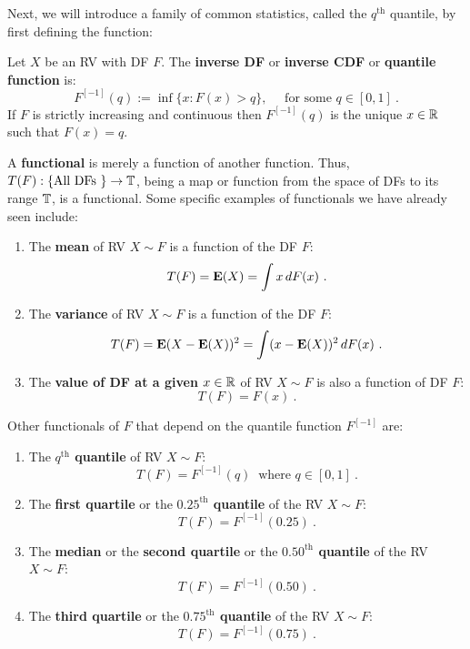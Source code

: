 Next, we will introduce a family of common statistics, called the $q^{\text{th}}$ quantile, by first defining the function:
\begin{definition}
Let $X$ be an RV with DF $F$.  The {\bf inverse DF} or {\bf inverse CDF} or {\bf quantile function} is:
\begin{equation}\label{E:InverseCDF}
F^{[-1]}(q) := \inf { \{ x: F(x) > q \}}, \quad \text{ for some $q \in [0,1]$} \ .
\end{equation} 
If $F$ is strictly increasing and continuous then $F^{[-1]}(q)$ is the unique $x \in \mathbb{R}$ such that $F(x)=q$.
\end{definition}
A {\bf functional} is merely a function of another function.  Thus, $T(F): \{ \text{All DFs }\} \to \mathbb{T}$, being a map or function from the space of DFs to its range $\mathbb{T}$, is a functional.  Some specific examples of functionals we have already seen include:
\begin{enumerate}
\item The {\bf mean} of RV $X \sim F$ is a function of the DF $F$:  
\[
T(F) = \e(X) = \int x\,dF(x) \ .
\]
\item The {\bf variance} of RV $X \sim F$ is a function of the DF $F$:  
\[
T(F) = \mathbf{E}(X-\mathbf{E}(X))^2 = \int (x-\mathbf{E}(X))^2\,dF(x) \ .
\]
\item The {\bf value of DF at a given $x \in \mathbb{R}$} of RV $X \sim F$ is also a function of DF $F$:
\[
T(F) = F(x) \  .
\]
\end{enumerate}
Other functionals of $F$ that depend on the quantile function $F^{[-1]}$ are:
\begin{enumerate}
\item The {\bf $q^{\text{th}}$ quantile} of RV $X \sim F$: 
\[
T(F) = F^{[-1]}(q) \ \text{ where } q \in [0,1] \ .
\]
\item The {\bf first quartile} or the {\bf $0.25^{\text{th}}$ quantile} of the RV $X \sim F$: 
\[
T(F) = F^{[-1]}(0.25) \ .
\]
\item The {\bf median} or the {\bf second quartile} or the {\bf $0.50^{\text{th}}$ quantile} of the RV $X \sim F$: 
\[
T(F) = F^{[-1]}(0.50) \  .
\]
\item The {\bf third quartile} or the {\bf $0.75^{\text{th}}$ quantile} of the RV $X \sim F$: 
\[
T(F) = F^{[-1]}(0.75) \ .
\]
\end{enumerate}

